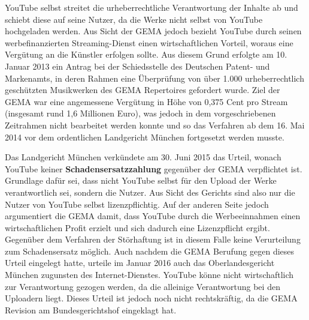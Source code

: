 YouTube selbst streitet die urheberrechtliche Verantwortung der Inhalte ab und schiebt diese auf seine Nutzer, da die Werke nicht selbst von YouTube hochgeladen werden. Aus Sicht der GEMA jedoch bezieht YouTube durch seinen werbefinanzierten Streaming-Dienst einen wirtschaftlichen Vorteil, woraus eine Vergütung an die Künstler erfolgen sollte. Aus diesem Grund erfolgte am  10. Januar 2013 ein Antrag bei der Schiedsstelle des Deutschen Patent- und Markenamts, in deren Rahmen eine Überprüfung von über 1.000 urheberrechtlich geschützten Musikwerken des GEMA Repertoires gefordert wurde. Ziel der GEMA war eine angemessene Vergütung in Höhe von 0,375 Cent pro Stream (insgesamt rund 1,6 Millionen Euro), was jedoch in dem vorgeschriebenen Zeitrahmen nicht bearbeitet werden konnte und so das Verfahren ab dem 16. Mai 2014 vor dem ordentlichen Landgericht München fortgesetzt werden musste.

Das Landgericht München verkündete am 30. Juni 2015 das Urteil, wonach YouTube keiner \textbf{Schadensersatzzahlung} gegenüber der GEMA verpflichtet ist. Grundlage dafür sei, dass nicht YouTube selbst für den Upload der Werke verantwortlich sei, sondern die Nutzer. Aus Sicht des Gerichts sind also nur die Nutzer von YouTube selbst lizenzpflichtig. Auf der anderen Seite jedoch argumentiert die GEMA damit, dass YouTube durch die Werbeeinnahmen einen wirtschaftlichen Profit erzielt und sich dadurch eine Lizenzpflicht ergibt. Gegenüber dem Verfahren der Störhaftung ist in diesem Falle keine Verurteilung zum Schadensersatz möglich. Auch nachdem die GEMA Berufung gegen dieses Urteil eingelegt hatte, urteile im Januar 2016 auch das Oberlandesgericht München zugunsten des Internet-Dienstes. YouTube könne nicht wirtschaftlich zur Verantwortung gezogen werden, da die alleinige Verantwortung bei den Uploadern liegt. Dieses Urteil ist jedoch noch nicht rechtskräftig, da die GEMA Revision am Bundesgerichtshof eingeklagt hat.

